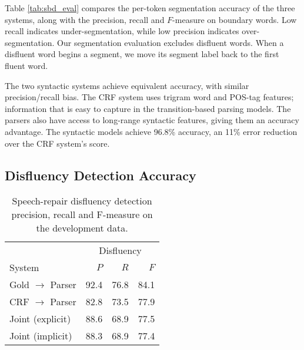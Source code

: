 \documentclass[11pt,letterpaper]{article}
\begin{document}
Table \ref{tab:sbd_eval} compares the per-token segmentation accuracy of the
three systems, along with the precision, recall and $F$-measure on boundary
words.  Low recall indicates under-segmentation, while low precision indicates
over-segmentation.  Our segmentation evaluation excludes disfluent words.  When
a disfluent word begins a segment, we move its segment label back to the first
fluent word.


The two syntactic systems achieve equivalent accuracy, with similar precision/recall
bias.  The CRF system uses trigram word and POS-tag features; information that
is easy to capture in the transition-based parsing models.  The parsers also
have access to long-range syntactic features, giving them an accuracy advantage.
The syntactic models achieve 96.8\% accuracy, an 11\% error reduction over the
CRF system's score.

\subsection{Disfluency Detection Accuracy}

\begin{table}
    \centering
    \small
    \begin{tabular}{l|rrr}
               & \multicolumn{3}{c}{Disfluency} \\
        System & $P$ & $R$ & $F$ \\
        \hline \hline
        Gold $\rightarrow$ Parser & 92.4 & 76.8 & 84.1 \\
        CRF $\rightarrow$ Parser  & 82.8 & 73.5 & 77.9 \\
        Joint (explicit)          & 88.6 & 68.9 & 77.5 \\
        Joint (implicit)          & 88.3 & 68.9 & 77.4 \\
        \hline
   \end{tabular}
    \caption{\small Speech-repair disfluency detection precision, recall and
        F-measure on the development data.
         \label{tab:dfl}}
\vspace*{-4em}
\end{table}
\end{document}
